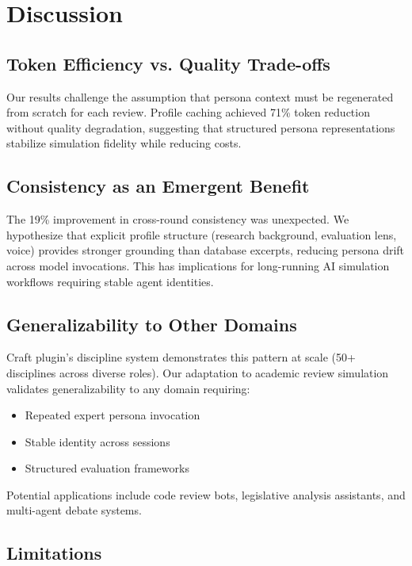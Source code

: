\section{Discussion}

\subsection{Token Efficiency vs. Quality Trade-offs}

Our results challenge the assumption that persona context must be regenerated from scratch for each review. Profile caching achieved 71\% token reduction without quality degradation, suggesting that structured persona representations stabilize simulation fidelity while reducing costs.

\subsection{Consistency as an Emergent Benefit}

The 19\% improvement in cross-round consistency was unexpected. We hypothesize that explicit profile structure (research background, evaluation lens, voice) provides stronger grounding than database excerpts, reducing persona drift across model invocations. This has implications for long-running AI simulation workflows requiring stable agent identities.

\subsection{Generalizability to Other Domains}

Craft plugin's discipline system demonstrates this pattern at scale (50+ disciplines across diverse roles). Our adaptation to academic review simulation validates generalizability to any domain requiring:

\begin{itemize}
\item Repeated expert persona invocation
\item Stable identity across sessions
\item Structured evaluation frameworks
\end{itemize}

Potential applications include code review bots, legislative analysis assistants, and multi-agent debate systems.

\subsection{Limitations}

